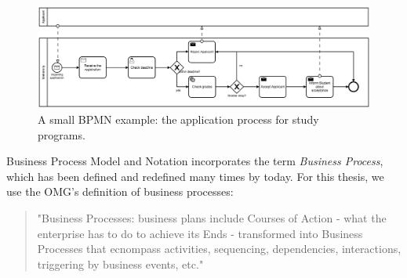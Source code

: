 \begin{figure}

	\centering
	\includegraphics[scale=0.5]{../figures/chapter_indicators/BPMN_Example_Student_Application.png} 
		\caption{A small BPMN example: the application process for study programs.}
	\label{fig:BPMNex}
\end{figure}

Business Process Model and Notation incorporates the term \textit{Business Process}, which has been defined and redefined many times by today. For this thesis, we use the OMG's definition of business processes: 

\begin{quote}
"Business Processes: business plans include Courses of Action - what the enterprise has to do to achieve its Ends - transformed into Business Processes that ecnompass activities, sequencing, dependencies, interactions, triggering by business events, etc." \cite{bmm2015}
\end{quote}

